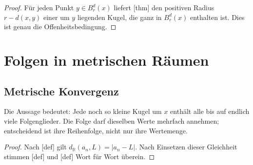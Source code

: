 \documentclass[main.tex]{subfiles}
\begin{document}
\begin{proof}
Für jeden Punkt \(y\in B_r^d(x)\) liefert
[thm] den positiven Radius
\(r-d(x,y)\) einer um \(y\) liegenden Kugel, die ganz in
\(B_r^d(x)\) enthalten ist. Dies ist genau die Offenheitsbedingung.
\end{proof}

\chapter{Folgen in metrischen Räumen}

\section{Metrische Konvergenz}


Die Aussage bedeutet: Jede noch so kleine Kugel um \(x\) enthält alle bis
auf endlich viele Folgenglieder. Die Folge darf dieselben Werte mehrfach
annehmen; entscheidend ist ihre Reihenfolge, nicht nur ihre Wertemenge.

\begin{proof}
Nach [def] gilt
\(d_{\mathbb R}(a_n,L)=|a_n-L|\). Nach Einsetzen dieser Gleichheit stimmen
[def] und
[def] Wort für Wort überein.
\end{proof}
\end{document}
